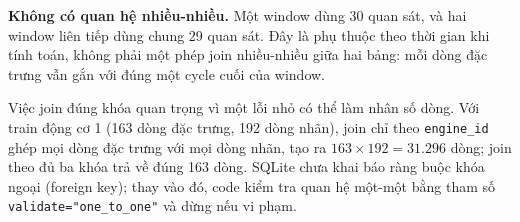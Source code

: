\textbf{Không có quan hệ nhiều-nhiều.} Một window dùng 30 quan sát, và hai window
liên tiếp dùng chung 29 quan sát. Đây là phụ thuộc theo thời gian khi tính toán,
không phải một phép join nhiều-nhiều giữa hai bảng: mỗi dòng đặc trưng vẫn gắn với
đúng một cycle cuối của window.

Việc join đúng khóa quan trọng vì một lỗi nhỏ có thể làm nhân số dòng. Với train
động cơ 1 (163 dòng đặc trưng, 192 dòng nhãn), join chỉ theo \texttt{engine\_id}
ghép mọi dòng đặc trưng với mọi dòng nhãn, tạo ra $163\times192=31.296$ dòng; join
theo đủ ba khóa trả về đúng 163 dòng. SQLite chưa khai báo ràng buộc khóa ngoại
(foreign key); thay vào đó, code kiểm tra quan hệ một-một bằng tham số
\texttt{validate="one\_to\_one"} và dừng nếu vi phạm.
